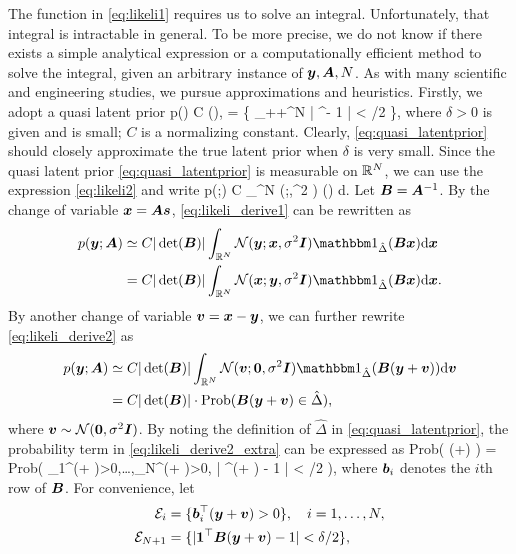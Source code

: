 \documentclass[10pt,twocolumn,twoside]{IEEEtran}
\begin{document}
The function in \eqref{eq:likeli1} requires us to solve an integral.
Unfortunately, that integral is intractable in general.
To be more precise, we do not know if there exists a simple analytical expression or a computationally efficient method to solve the integral, given an arbitrary instance of ${\bm y},{\bm A},N$.
As with many scientific and engineering studies, we pursue approximations and heuristics.
Firstly, we adopt a quasi latent prior
\beq \label{eq:quasi_latentprior}
p(\bs) \simeq C \cdot \indfn{\hat{\Delta}}(\bs), \quad \hat{\Delta} = \{ \bs \in \Rbb_{++}^N \mid  | \bone^\top \bs - 1 | < \delta/2 \},
\eeq
where $\delta > 0$ is given and is small; $C$ is a normalizing constant.
Clearly, \eqref{eq:quasi_latentprior} should closely approximate the true latent prior when $\delta$ is very small.
Since the quasi latent prior \eqref{eq:quasi_latentprior} is measurable on $\mathbb{R}^N$, we can use the expression \eqref{eq:likeli2} and write
\beq \label{eq:likeli_derive1}
p(\by;\bA) \simeq C \int_{\Rbb^N} \setN(\by;\bA\bs,\sigma^2 \bI)  \indfn{\hat{\Delta}}(\bs) {\rm d}\bs.
\eeq
Let ${\bm B} = {\bm A}^{-1}$. By the change of variable ${\bm x} = {\bm A} {\bm s}$, \eqref{eq:likeli_derive1} can be rewritten as
\begin{align}
p(\by;\bA) & \simeq C | \det(\bB) | \int_{\Rbb^N} \setN(\by;\bx,\sigma^2 \bI)  \indfn{\hat{\Delta}}(\bB \bx) {\rm d}\bx
\nonumber \\
&
=  C | \det(\bB) | \int_{\Rbb^N} \setN(\bx;\by,\sigma^2 \bI)  \indfn{\hat{\Delta}}(\bB \bx) {\rm d}\bx.
\label{eq:likeli_derive2}
\end{align}
By another change of variable $ {\bm v} = {\bm x} -{\bm y} $, we can further rewrite \eqref{eq:likeli_derive2} as
\begin{align}
p(\by;\bA) & \simeq C | \det(\bB) | \int_{\Rbb^N} \setN(\bv;\bzero,\sigma^2 \bI)  \indfn{\hat{\Delta}}(\bB(\by+\bv)) {\rm d}\bv \nonumber \\
& = C | \det(\bB) | \cdot {\rm Prob}( \bB(\by+\bv) \in \hat{\Delta} ),
\label{eq:likeli_derive2_extra}
\end{align}
where ${\bm v} \sim \mathcal{N}({\bm 0},\sigma^2 {\bm I})$.
By noting the definition of $ \hat{\Delta} $ in \eqref{eq:quasi_latentprior}, the probability term in \eqref{eq:likeli_derive2_extra} can be expressed as
\beq \label{eq:likeli_derive3}
{\rm Prob}( \bB(\by+\bv) \in \hat{\Delta} ) = {\rm Prob}\left( \bb_1^\top (\by + \bv)>0,\ldots,\bb_N^\top (\by + \bv)>0, | \bone^\top \bB(\by + \bv) - 1 | < \delta/2 \right),
\eeq
where ${\bm b}_i$ denotes the $i$th row of ${\bm B}$. For convenience, let
\begin{subequations}
	\begin{align}
	\mathcal{E}_i & = \{ {\bm b}_i^\top ({\bm y} + {\bm v}) > 0 \}, \quad i=1,\ldots,N,
	\label{eq:E1}
	\\
	\mathcal{E}_{N+1} & = \{ | {\bm 1}^\top {\bm B}({\bm y} + {\bm v}) - 1 | < \delta/2 \},
	\label{eq:E2}
	\end{align}
\end{subequations}
\end{document}

